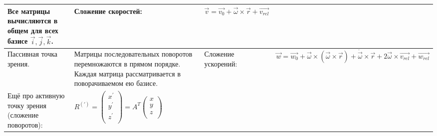 \documentclass{article}
\begin{document}
\begin{tabular}{ |p{3.8cm}|p{5.7cm}|p{3.8cm}|p{5.7cm}|  }
Все матрицы вычисляются в общем для всех базисе $\vec{i}, \vec{j}, \vec{k}$. &  %
Сложение скоростей:                                                          &  %
$\vec{v} = \vec{v_0} + \vec{\omega} \times \vec{r} + \vec{v_{rel}}$          \\ %
\hline
Пассивная точка зрения.                                                      &  %
Матрицы последовательных поворотов перемножаются в прямом порядке.
Каждая матрица рассматривается в поворачиваемом ею базисе.                   &  %
Сложение ускорений:                                                          &  %
$\vec{w} = \vec{w_0} + \vec{\omega} \times (\vec{\omega} \times \vec{r}) +
 \dot{\vec{\omega}} \times \vec{r} + 2 \vec{\omega} \times \vec{v_{rel}} +
 \vec{w_{rel}}$                           \\ %
\hline
Ещё про активную точку зрения (сложение поворотов):                          &  %
$R^{\left(\prime\right)} =
\left(\begin{array}{c}
x^\prime \\
y^\prime \\
z^\prime \\
\end{array}\right) =
A^{T}
\left(\begin{array}{c}
x \\
y \\
z \\
\end{array}\right)$                                                          &  %
                                                                             &  %
                                                                             \\ %
\hline
\end{tabular}
\end{document}

